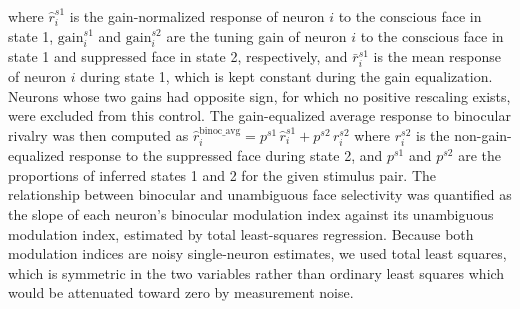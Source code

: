 \documentclass{article}
\begin{document}
where $\hat{r}^{s1}_i$ is the gain-normalized response of neuron $i$ to the conscious face in state 1, $\mathrm{gain}^{s1}_i$ and $\mathrm{gain}^{s2}_i$ are the tuning gain of neuron $i$ to the conscious face in state 1 and suppressed face in state 2, respectively, and $\bar{r}^{s1}_i$ is the mean response of neuron $i$ during state 1, which is kept constant during the gain equalization. Neurons whose two gains had opposite sign, for which no positive rescaling exists, were excluded from this control. The gain-equalized average response to binocular rivalry was then computed as $\hat{r}^{\mathrm{binoc\_avg}}_i = p^{s1}\,\hat{r}^{s1}_i + p^{s2}\,r^{s2}_i$ where $r^{s2}_i$ is the non-gain-equalized response to the suppressed face during state 2, and $p^{s1}$ and $p^{s2}$ are the proportions of inferred states 1 and 2 for the given stimulus pair. The relationship between binocular and unambiguous face selectivity was quantified as the slope of each neuron's binocular modulation index against its unambiguous modulation index, estimated by total least-squares regression. Because both modulation indices are noisy single-neuron estimates, we used total least squares, which is symmetric in the two variables rather than ordinary least squares which would be attenuated toward zero by measurement noise.
\end{document}
